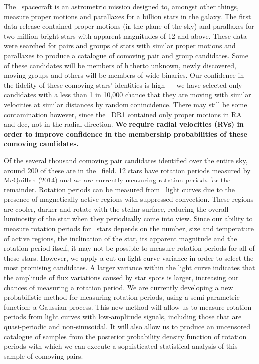The \gaia\ spacecraft is an astrometric mission designed to, amongst other
things, measure proper motions and parallaxes for a billion stars in the
galaxy.
The first data release contained proper motions (in the plane of the
sky) and parallaxes for two million bright stars with apparent magnitudes of
12 and above.
These data were searched for pairs and groups of stars with similar proper
motions and parallaxes to produce a catalogue of comoving pair and group
candidates.
Some of these candidates will be members of hitherto unknown, newly
discovered, moving groups and others will be members of wide binaries.
Our confidence in the fidelity of these comoving stars' identities is
high --- we have selected only candidates with a less than 1 in 10,000 chance
that they are moving with similar velocities at similar distances by random
conincidence.
There may still be some contamination however, since the \gaia\ DR1 contained
only proper motions in RA and dec, not in the radial direction.
{\bf We require radial velocities (RVs) in order to improve confidence in
the membership probabilities of these comoving candidates.}

Of the several thousand comoving pair candidates identified over the entire
sky, around 200 of these are in the \kepler\ field.
12 stars have rotation periods measured by McQuillan (2014) and we are
currently measuring rotation periods for the remainder.
Rotation periods can be measured from \kepler\ light curves due to the
presence of magnetically active regions with suppressed convection.
These regions are cooler, darker and rotate with the stellar surface, reducing
the overall luminosity of the star when they periodically come into view.
Since our ability to measure rotation periods for \kepler\ stars depends on
the number, size and temperature of active regions, the inclination of the
star, its apparent magnitude and the rotation period itself, it may not be
possible to measure rotation periods for all of these stars.
However, we apply a cut on light curve variance in order to select the most
promising candidates.
A larger variance within the light curve indicates that the amplitude of flux
variations caused by star spots is larger, increasing our chances of measuring
a rotation period.
We are currently developing a new probabilistic method for measuring rotation
periods, using a semi-parametric function; a Gaussian process.
This new method will allow us to measure rotation periods from light curves
with low-amplitude signals, including those that are quasi-periodic and
non-sinusoidal.
It will also allow us to produce an uncensored catalogue of samples from the
posterior probability density function of rotation periods with which we can
execute a sophisticated statistical analysis of this sample of comoving pairs.


